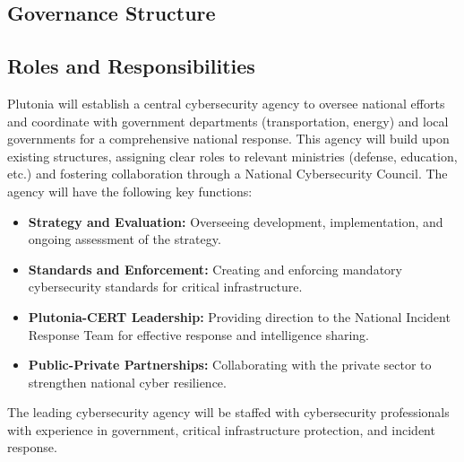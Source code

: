 \documentclass[
	a4paper, %
	10pt, %
]{CSSullivanBusinessReport}
\begin{document}
\begin{fullwidth}
\begin{justify}
\section{Governance Structure}
\subsection{Roles and Responsibilities}
Plutonia will establish a central cybersecurity agency to oversee national efforts and coordinate with government departments (transportation, energy) and local governments for a comprehensive national response. This agency will build upon existing structures, assigning clear roles to relevant ministries (defense, education, etc.) and fostering collaboration through a National Cybersecurity Council.
The agency will have the following key functions:
\begin{itemize}
	\item \textbf{Strategy and Evaluation:} Overseeing development, implementation, and ongoing assessment of the strategy.
	\item \textbf{Standards and Enforcement:} Creating and enforcing mandatory cybersecurity standards for critical infrastructure.
	\item \textbf{Plutonia-CERT Leadership:} Providing direction to the National Incident Response Team for effective response and intelligence sharing.
	\item \textbf{Public-Private Partnerships:} Collaborating with the private sector to strengthen national cyber resilience.
\end{itemize}
The leading cybersecurity agency will be staffed with cybersecurity professionals with experience in government, critical infrastructure protection, and incident response.


\end{justify}
\end{fullwidth}
\end{document}
